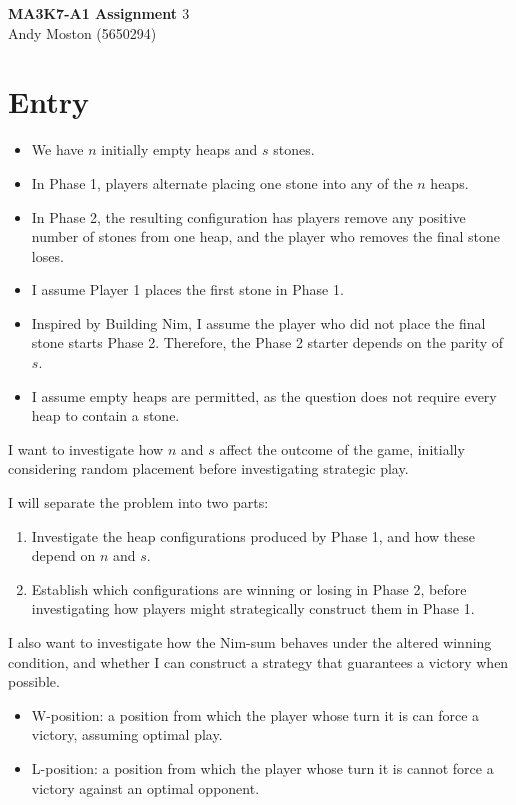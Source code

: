 \documentclass[11pt]{article}
\newcommand{\keywordfont}{\textsc}
\newcommand{\keyword}[1]{%
  \marginpar{\raggedright\small\keywordfont{#1}}}
\begin{document}
\Large
\begin{center}
\textbf{MA3K7-A1 Assignment $3$}
\\
Andy Moston (5650294)
\end{center}
\normalsize



\section{Entry}
\begin{itemize}
\item We have $n$ initially \keyword{I Know} empty heaps and $s$ stones.
\item In Phase 1, players alternate placing one stone into any of the $n$ heaps.
\item In Phase 2, the resulting configuration has players remove any positive number of stones from one heap, and the player who removes the final stone loses.
\item I assume Player 1 places the first stone in Phase 1.
\item Inspired by Building Nim, I assume the player who did not place the final stone starts Phase 2. Therefore, the Phase 2 starter depends on the parity of $s$.
\item I assume empty heaps are permitted, as the question does not require every heap to contain a stone.
\end{itemize}

I want to \keyword{What I Want} investigate how $n$ and $s$ affect the outcome of the game, initially considering random placement before investigating strategic play.

I will separate the problem into two parts:

\begin{enumerate}
\item Investigate the heap configurations produced by Phase 1, and how these depend on $n$ and $s$.
\item Establish which configurations are winning or losing in Phase 2, before investigating how players might strategically construct them in Phase 1.
\end{enumerate}

I also want to investigate how the Nim-sum behaves under the altered winning condition, and whether I can construct a strategy that guarantees a victory when possible.

\begin{itemize}
\item W-position: a position from which \keyword{Notation} the player whose turn it is can force a victory, assuming optimal play.
\item L-position: a position from which the player whose turn it is cannot force a victory against an optimal opponent.
\end{itemize}
\end{document}

